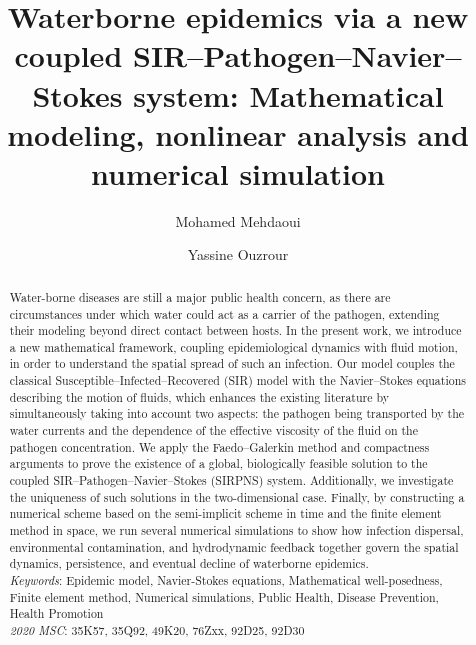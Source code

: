 \documentclass[10pt,number,preprint,times]{elsarticle}
\date{}
\numberwithin{equation}{section} %
\begin{document}
	\maketitle
	\begin{abstract}
Water-borne diseases are still a major public health concern, as there are circumstances under which water could act as a carrier of the pathogen, extending their modeling beyond direct contact between hosts. In the present work, we introduce a new mathematical framework, coupling epidemiological dynamics with fluid motion, in order to understand the spatial spread of such an infection. Our model couples the classical Susceptible–Infected–Recovered (SIR) model with the Navier–Stokes equations describing the motion of fluids, which enhances the existing literature by simultaneously taking into account two aspects: the pathogen being transported by the water currents and the dependence of the effective viscosity of the fluid on the pathogen concentration. We apply the Faedo–Galerkin method and compactness arguments to prove the existence of a global, biologically feasible solution to the coupled SIR–Pathogen–Navier–Stokes (SIRPNS) system. Additionally, we investigate the uniqueness of such solutions in the two-dimensional case. Finally, by constructing a numerical scheme based on the semi-implicit scheme in time and the finite element method in space, we run several numerical simulations to show how infection dispersal, environmental contamination, and hydrodynamic feedback together govern the spatial dynamics, persistence, and eventual decline of waterborne epidemics.
	\\[1ex]
		\textit{Keywords}: 	Epidemic model, Navier-Stokes equations, Mathematical well-posedness, Finite element method, Numerical simulations, Public Health, Disease Prevention, Health Promotion\\
		\textit{2020 MSC}: 35K57, 35Q92, 49K20, 76Zxx, 92D25, 92D30
	\end{abstract}
	\begin{frontmatter}
		\title{Waterborne epidemics via a new coupled SIR–Pathogen--Navier–Stokes system: Mathematical modeling, nonlinear analysis and numerical simulation}
		
		
		\author{Mohamed Mehdaoui}
		\address{Euromed University of Fez, UEMF, 30 000, Fez, Morocco}
		
		\author{Yassine Ouzrour}
		\address{Laboratoire de Mathématiques et Applications aux Sciences de l'Ingénieur, Ecole Normale Supérieure de Fès, Université Sidi Mohamed Ben Abdellah, Morocco}
		
		
	\end{frontmatter}
	
\end{document}
